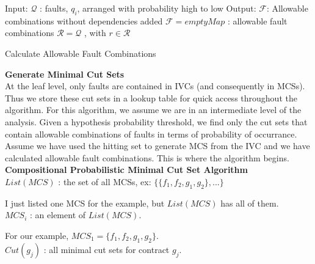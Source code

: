 \begin{algorithm}[H]
	Input: $\mathcal{Q}$ : faults, $q_i$, arranged with probability high to low \;
	Output: $\mathcal{F}$: Allowable combinations without dependencies added  \;
	$\mathcal{F} = emptyMap$ : allowable fault combinations  \;
	$\mathcal{R} = \mathcal{Q}$ , with $r \in \mathcal{R}$\;
	\caption{Calculate Allowable Fault Combinations}
\end{algorithm}



\textbf{Generate Minimal Cut Sets}\\

At the leaf level, only faults are contained in IVCs (and consequently in MCSs). Thus we store these cut sets in a lookup table for quick access throughout the algorithm. For this algorithm, we assume we are in an intermediate level of the analysis. Given a hypothesis probability threshold, we find only the cut sets that contain allowable combinations of faults in terms of probability of occurrance.\\

Assume we have used the hitting set to generate MCS from the IVC and we have calculated allowable fault combinations. This is where the algorithm begins. \\

\textbf{Compositional Probabilistic Minimal Cut Set Algorithm}\\

$List(MCS)$ : the set of all MCSs, ex: $\{\{f_1,f_2,g_1,g_2\}, ...\}$ 

I just listed one MCS for the example, but $List(MCS)$ has all of them. \\

$MCS_i$ : an element of $List(MCS)$. 

For our example, $MCS_1 = \{f_1,f_2,g_1,g_2\}$.\\

$Cut(g_j)$ : all minimal cut sets for contract $g_j$. 

